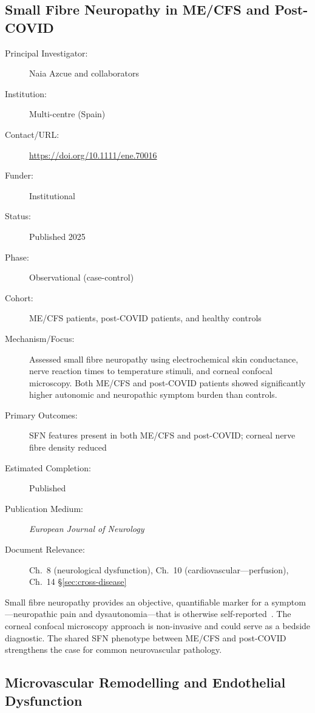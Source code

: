 \subsection{Small Fibre Neuropathy in ME/CFS and Post-COVID}
\label{sec:registry-sfn}

\begin{description}
    \item[Principal Investigator:] Naia Azcue and collaborators
    \item[Institution:] Multi-centre (Spain)
    \item[Contact/URL:] \url{https://doi.org/10.1111/ene.70016}
    \item[Funder:] Institutional
    \item[Status:] Published 2025
    \item[Phase:] Observational (case-control)
    \item[Cohort:] ME/CFS patients, post-COVID patients, and healthy controls
    \item[Mechanism/Focus:] Assessed small fibre neuropathy using
        electrochemical skin conductance, nerve reaction times to temperature
        stimuli, and corneal confocal microscopy.  Both ME/CFS and post-COVID
        patients showed significantly higher autonomic and neuropathic symptom
        burden than controls.
    \item[Primary Outcomes:] SFN features present in both ME/CFS and
        post-COVID; corneal nerve fibre density reduced
    \item[Estimated Completion:] Published
    \item[Publication Medium:] \textit{European Journal of Neurology}
    \item[Document Relevance:] Ch.~8 (neurological dysfunction), Ch.~10
        (cardiovascular---perfusion), Ch.~14 \S\ref{sec:cross-disease}
\end{description}

Small fibre neuropathy provides an objective, quantifiable marker for a
symptom---neuropathic pain and dysautonomia---that is otherwise
self-reported~\cite{Azcue2025sfn}.  The corneal confocal microscopy approach
is non-invasive and could serve as a bedside diagnostic.  The shared SFN
phenotype between ME/CFS and post-COVID strengthens the case for common
neurovascular pathology.

\subsection{Microvascular Remodelling and Endothelial Dysfunction}
\label{sec:registry-microvascular}

